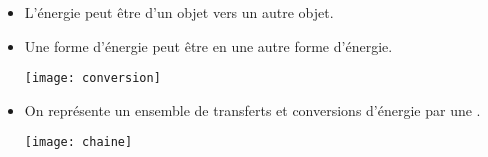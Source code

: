 \begin{mybilan}
	\begin{itemize}
		\item L'énergie peut être  d'un objet vers un autre objet.
		
		\item Une forme d'énergie peut être  en une autre forme d'énergie.
		
		
		\begin{center}
			\texttt{[image: conversion]}
		\end{center}
		
		\item On représente un ensemble de transferts et conversions d'énergie par une .

		\begin{center}
			\texttt{[image: chaine]}
		\end{center}
	\end{itemize}
\end{mybilan}

